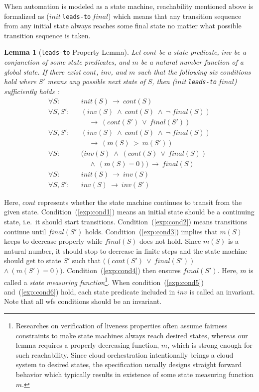 \documentclass[12pt]{report}
\newtheorem{lemma}{Lemma}
\newcommand{\ra}{\rightarrow}
\newcommand{\stt}[1]{{\small{\tt {#1}}}}
\begin{document}
When automation is modeled as a state machine, reachability mentioned
above is formalized as ($init~$\stt{leads-to}$~final$) which means
that any transition sequence from any initial state always reaches
some final state no matter what possible transition sequence is taken.
\begin{lemma}[\stt{leads-to} Property Lemma]
Let $cont$ be a state predicate, $inv$ be a conjunction of some state
predicates, and $m$ be a natural number function of a global state. If
there exist $cont$, $inv$, and $m$ such that the following six
conditions hold where $S'$ means any possible next state of $S$, then
($init~$\stt{leads-to}$~final$) sufficiently holds \cite{Futatsugi15}:
\begin{eqnarray}
\label{exp:cond1}
\forall S:&&init(S)\:\ra\: cont(S)\\
\label{exp:cond2}
\forall S,S':&&(inv(S)\;\land \:cont(S)\;\land \:\neg\;final(S))
\nonumber \\
 &&\:\:\:\:\:\ra\:(cont(S')\:\lor \:final(S'))\\
\label{exp:cond3}
\forall S,S':&&(inv(S)\;\land \:cont(S)\;\land \:\neg\;final(S))
\nonumber \\
 &&\:\:\:\:\:\ra\:(m(S)\: > \:m(S'))\\
\label{exp:cond4}
\forall S:&&(inv(S)\;\land\; (cont(S)\:\lor \:final(S))
\nonumber \\
 &&\:\:\:\:\:\land\:(m(S) = 0)) \:\ra\:final(S)\\
\label{exp:cond5}
\forall S:&&init(S)\:\ra\: inv(S)\\
\label{exp:cond6}
\forall S,S':&&inv(S)\:\ra\: inv(S')
\end{eqnarray}
\end{lemma}

Here, $cont$ represents whether the state machine continues to transit
from the given state.  Condition~(\ref{exp:cond1}) means an initial state should be
a continuing state, i.e.\ it should start transitions. Condition~(\ref{exp:cond2})
means transitions continue until $final(S')$ holds. Condition~(\ref{exp:cond3})
implies that $m(S)$ keeps to decrease properly while $final(S)$ does
not hold. Since $m(S)$ is a natural number, it should stop to decrease
in finite steps and the state machine should get to state $S'$ such
that $((cont(S')\ \lor\ final(S'))$ $\land\ (m(S') = 0))$.
Condition~(\ref{exp:cond4}) then ensures $final(S')$. Here, $m$ is called a {\it
  state measuring function}\footnote{Researches on verification of
  liveness properties often assume fairness constraints to make state
  machines always reach desired states, whereas our lemma requires a
  properly decreasing function, $m$, which is strong enough for such
  reachability.  Since cloud orchestration intentionally brings a
  cloud system to desired states, the specification usually designs
  straight forward behavior which typically results in existence of
  some state measuring function $m$.}.  When condition~(\ref{exp:cond5}) and~(\ref{exp:cond6})
hold, each state predicate included in $inv$ is called an
invariant. Note that all wfs conditions should be an invariant.
\end{document}
